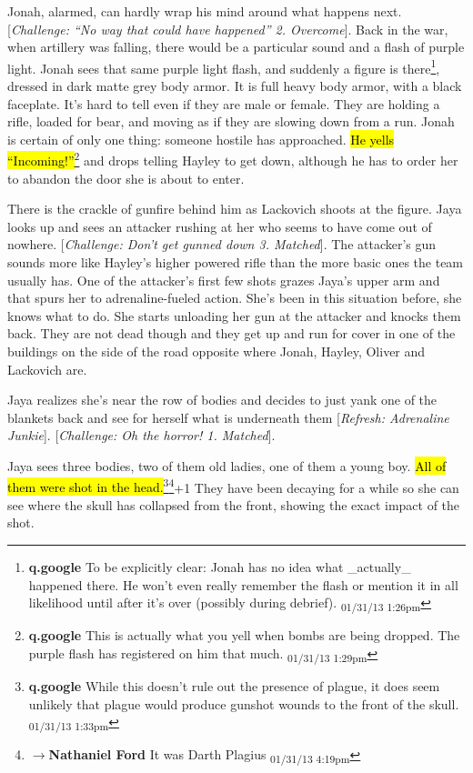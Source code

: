 Jonah, alarmed, can hardly wrap his mind around what happens next. {[}\textit{Challenge: ``No way that could have happened'' 2. Overcome}{]}.  Back in the war, when artillery was falling, there would be a particular sound and a flash of purple light.  Jonah sees that same purple light flash, and suddenly a figure is there\footnote{\textbf{q.google }To be explicitly clear: Jonah has no idea what \_actually\_ happened there.  He won't even really remember the flash or mention it in all likelihood until after it's over (possibly during debrief). \textsubscript{01/31/13 1:26pm}}, dressed in dark matte grey body armor.  It is full heavy body armor, with a black faceplate.  It's hard to tell even if they are male or female. They are holding a rifle, loaded for bear, and moving as if they are slowing down from a run.  Jonah is certain of only one thing: someone hostile has approached.  \hl{He yells ``Incoming!''}\footnote{\textbf{q.google }This is actually what you yell when bombs are being dropped.  The purple flash has registered on him that much. \textsubscript{01/31/13 1:29pm}} and drops telling Hayley to get down, although he has to order her to abandon the door she is about to enter.



There is the crackle of gunfire behind him as Lackovich shoots at the figure.  Jaya looks up and sees an attacker rushing at her who seems to have come out of nowhere. {[}\textit{Challenge: Don't get gunned down 3. Matched}{]}.  The attacker's gun sounds more like Hayley's higher powered rifle than the more basic ones the team usually has.  One of the attacker's first few shots grazes Jaya's upper arm and that spurs her to adrenaline-fueled action.  She's been in this situation before, she knows what to do.  She starts unloading her gun at the attacker and knocks them back.  They are not dead though and they get up and run for cover in one of the buildings on the side of the road opposite where Jonah, Hayley, Oliver and Lackovich are.



Jaya realizes she's near the row of bodies and decides to just yank one of the blankets back and see for herself what is underneath them {[}\textit{Refresh: Adrenaline Junkie}{]}.  {[}\textit{Challenge: Oh the horror! 1.  Matched}{]}.  



Jaya sees three bodies, two of them old ladies, one of them a young boy.  \hl{All of them were shot in the head.}\footnote{\textbf{q.google }While this doesn't rule out the presence of plague, it does seem unlikely that plague would produce gunshot wounds to the front of the skull. \textsubscript{01/31/13 1:33pm}}\footnote{$\rightarrow$\textbf{Nathaniel Ford }It was Darth Plagius \textsubscript{01/31/13 4:19pm}}+1  They have been decaying for a while so she can see where the skull has collapsed from the front, showing the exact impact of the shot.



